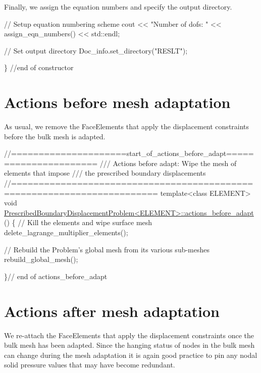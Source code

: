 Finally, we assign the equation numbers and specify the output directory.


\begin{DoxyCodeInclude}

 \textcolor{comment}{// Setup equation numbering scheme}
 cout << \textcolor{stringliteral}{"Number of dofs: "} << assign\_eqn\_numbers() << std::endl; 

 \textcolor{comment}{// Set output directory}
 Doc\_info.set\_directory(\textcolor{stringliteral}{"RESLT"});

\} \textcolor{comment}{//end of constructor}

\end{DoxyCodeInclude}




 

\hypertarget{index_actions_before_adapt}{}\section{Actions before mesh adaptation}\label{index_actions_before_adapt}
As usual, we remove the {\ttfamily Face\+Elements} that apply the displacement constraints before the bulk mesh is adapted.

 
\begin{DoxyCodeInclude}
\textcolor{comment}{//=====================start\_of\_actions\_before\_adapt======================}
\textcolor{comment}{/// Actions before adapt: Wipe the mesh of elements that impose}
\textcolor{comment}{}\textcolor{comment}{/// the prescribed boundary displacements}
\textcolor{comment}{}\textcolor{comment}{//========================================================================}
\textcolor{keyword}{template}<\textcolor{keyword}{class} ELEMENT>
\textcolor{keywordtype}{void} \hyperlink{classPrescribedBoundaryDisplacementProblem_a2e9f335e8680b0f2338b579e37e9d38a}{PrescribedBoundaryDisplacementProblem<ELEMENT>::actions\_before\_adapt}
      ()
\{
 \textcolor{comment}{// Kill the  elements and wipe surface mesh}
 delete\_lagrange\_multiplier\_elements();
 
 \textcolor{comment}{// Rebuild the Problem's global mesh from its various sub-meshes}
 rebuild\_global\_mesh();

\}\textcolor{comment}{// end of actions\_before\_adapt}

\end{DoxyCodeInclude}




 

\hypertarget{index_actions_after_adapt}{}\section{Actions after mesh adaptation}\label{index_actions_after_adapt}
We re-\/attach the {\ttfamily Face\+Elements} that apply the displacement constraints once the bulk mesh has been adapted. Since the hanging status of nodes in the bulk mesh can change during the mesh adaptation it is again good practice to pin any nodal solid pressure values that may have become redundant.

